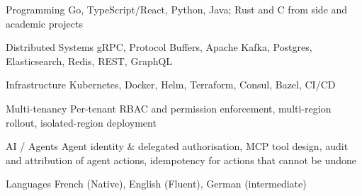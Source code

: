 

\begin{cvskills}

\cvskill
  {Programming} %
  {Go, TypeScript/React, Python, Java; Rust and C from side and academic projects} %

  \cvskill
    {Distributed Systems} %
    {gRPC, Protocol Buffers, Apache Kafka, Postgres, Elasticsearch, Redis, REST, GraphQL} %

  \cvskill
    {Infrastructure} %
    {Kubernetes, Docker, Helm, Terraform, Consul, Bazel, CI/CD} %

  \cvskill
    {Multi-tenancy} %
    {Per-tenant RBAC and permission enforcement, multi-region rollout, isolated-region deployment} %

  \cvskill
    {AI / Agents} %
    {Agent identity \& delegated authorisation, MCP tool design, audit and attribution of agent actions, idempotency for actions that cannot be undone} %

  \cvskill
    {Languages} %
    {French (Native), English (Fluent), German (intermediate)} %

\end{cvskills}
